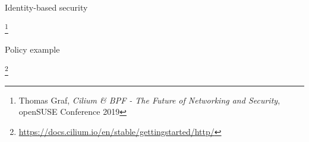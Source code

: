 \documentclass[black,white]{beamer}
\newcommand\blfootnote[1]{%
  \begingroup
  \renewcommand\thefootnote{}\footnote{#1}%
  \addtocounter{footnote}{-1}%
  \endgroup
}
\DeclareRobustCommand{\#}{\adjustbox{valign=B,totalheight=.57\baselineskip}{\oldhash}}%
\begin{document}

    \begin{frame}{Identity-based security}
        \centering
        \vfill
        \begin{figure}
            
        \end{figure}
        \vfill
        \blfootnote{{\tiny Thomas Graf, {\em Cilium \& BPF - The Future of Networking and Security}, openSUSE Conference 2019}}
    \end{frame}

    \begin{frame}{Policy example}
        
        \blfootnote{\tiny \url{https://docs.cilium.io/en/stable/gettingstarted/http/}}
    \end{frame}

\end{document}
